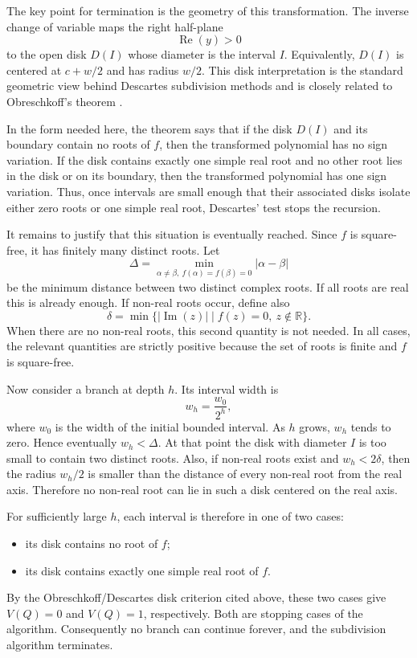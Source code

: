 \documentclass[letterpaper]{article}
\newcommand{\RR}{\mathbb{R}}
\begin{document}
The key point for termination is the geometry of this transformation. The
inverse change of variable maps the right half-plane
\[
  \operatorname{Re}(y)>0
\]
to the open disk $D(I)$ whose diameter is the interval $I$. Equivalently,
$D(I)$ is centered at $c+w/2$ and has radius $w/2$. This disk interpretation
is the standard geometric view behind Descartes subdivision methods and is
closely related to Obreschkoff's theorem
\cite{collinsAkritas1976,rouillierZimmermann2004}.

In the form needed here, the theorem says that if the disk $D(I)$ and its
boundary contain no roots of $f$, then the transformed polynomial has no sign
variation. If the disk contains exactly one simple real root and no other root
lies in the disk or on its boundary, then the transformed polynomial has one
sign variation. Thus, once intervals are small enough that their associated
disks isolate either zero roots or one simple real root, Descartes' test stops
the recursion.

It remains to justify that this situation is eventually reached. Since $f$ is
square-free, it has finitely many distinct roots. Let
\[
  \Delta =
  \min_{\alpha\neq\beta,\ f(\alpha)=f(\beta)=0}
  |\alpha-\beta|
\]
be the minimum distance between two distinct complex roots. If all roots are
real this is already enough. If non-real roots occur, define also
\[
  \delta =
  \min\{|\operatorname{Im}(z)| \mid f(z)=0,\ z\notin\RR\}.
\]
When there are no non-real roots, this second quantity is not needed. In all
cases, the relevant quantities are strictly positive because the set of roots
is finite and $f$ is square-free.

Now consider a branch at depth $h$. Its interval width is
\[
  w_h = \frac{w_0}{2^h},
\]
where $w_0$ is the width of the initial bounded interval. As $h$ grows,
$w_h$ tends to zero. Hence eventually $w_h<\Delta$. At that point the disk
with diameter $I$ is too small to contain two distinct roots. Also, if
non-real roots exist and $w_h<2\delta$, then the radius $w_h/2$ is smaller
than the distance of every non-real root from the real axis. Therefore no
non-real root can lie in such a disk centered on the real axis.

For sufficiently large $h$, each interval is therefore in one of two cases:
\begin{itemize}
  \item its disk contains no root of $f$;
  \item its disk contains exactly one simple real root of $f$.
\end{itemize}
By the Obreschkoff/Descartes disk criterion cited above, these two cases give
$V(Q)=0$ and $V(Q)=1$, respectively. Both are stopping cases of the
algorithm. Consequently no branch can continue forever, and the subdivision
algorithm terminates.
\end{document}
